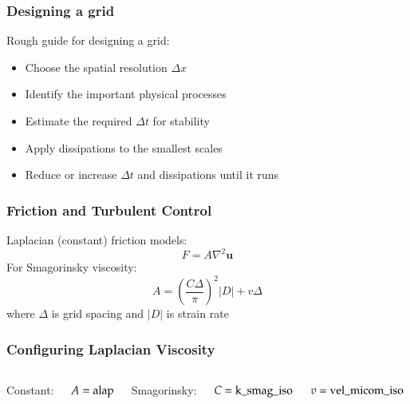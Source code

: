 \documentclass[red]{beamer}
\begin{document}
\begin{frame}
    \frametitle{Designing a grid}
    
    Rough guide for designing a grid:
    \begin{itemize}
        \item Choose the spatial resolution $\Delta x$
        \item Identify the important physical processes
        \item Estimate the required $\Delta t$ for stability
        \item Apply dissipations to the smallest scales
        \item Reduce or increase $\Delta t$ and dissipations until it runs
    \end{itemize}
\end{frame}

\begin{frame}
    \frametitle{Friction and Turbulent Control}
    
    Laplacian (constant) friction models:
    $$
    F = A \nabla^2 \mathbf{u}
    $$
    For Smagorinsky viscosity:
    $$
    A = \left(\frac{C \Delta}{\pi}\right)^2 |D| + v \Delta
    $$
    where $\Delta$ is grid spacing and $|D|$ is strain rate
\end{frame}

\begin{frame}
    \frametitle{Configuring Laplacian Viscosity}
    
    \begin{columns}
        
        Constant:
        
        $A = \text{\lstinline|alap|}$
        
        \vspace{10pt}
        
        Smagorinsky:
        
        $C = \text{\lstinline|k_smag_iso|}$
        
        $v = \text{\lstinline|vel_micom_iso|}$
    \end{columns}
\end{frame}

\end{document}
